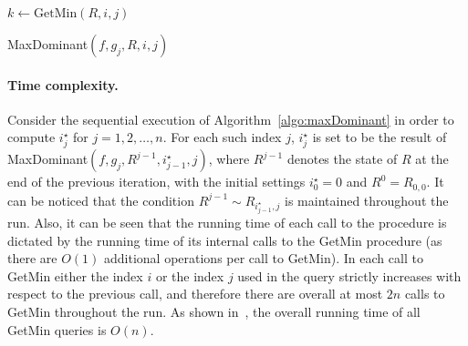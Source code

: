 
\begin{algorithm}
	$k \gets \text{GetMin}(R, i, j)$\;
	\;
	\caption{MaxDominant$(f, g_j, R, i, j)$}
	\label{algo:maxDominant}
\end{algorithm}


\paragraph{Time complexity.}
Consider the sequential execution of Algorithm~\ref{algo:maxDominant} in order to compute $i^\star_j$ for $j = 1, 2, \ldots, n$. For each such index $j$, $i^\star_j$ is set to be the result of MaxDominant$(f, g_j, R^{j-1}, i^\star_{j-1}, j)$, where $R^{j-1}$ denotes the state of $R$ at the end of the previous iteration, with the initial settings $i^\star_0 = 0$ and $R^0 = R_{0, 0}$. It can be noticed that the condition $R^{j-1} \sim R_{i^\star_{j-1}, j}$ is maintained throughout the run. Also, it can be seen that the running time of each call to the procedure is dictated by the running time of its internal calls to the GetMin procedure (as there are $O(1)$ additional operations per call to GetMin). In each call to GetMin either the index $i$ or the index $j$ used in the query strictly increases with respect to the previous call, and therefore there are overall at most $2n$ calls to GetMin throughout the run. As shown in~\cite{lee2007simple}, the overall running time of all GetMin queries is $O(n)$.


